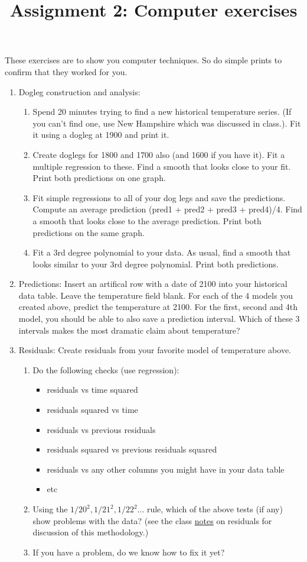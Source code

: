 \documentclass[11pt]{article}
\begin{document}
\title{Assignment 2: Computer exercises}

These exercises are to show you computer techniques.  So do simple
 prints to confirm that they worked for you.

\begin{enumerate}
\item Dogleg construction and analysis:
\begin{enumerate}
\item Spend 20 minutes trying to find a new historical temperature
series.  (If you can't find one, use New Hampshire which was discussed
in class.).   Fit it using a dogleg at 1900 and print it.
\item Create doglegs for 1800 and 1700 also (and 1600 if you have
it).  Fit a multiple regression to these.  Find a smooth that looks
close to your fit.  Print both predictions on one graph. 
\item Fit simple regressions to all of your dog legs and save the
predictions.  Compute an average prediction (pred1 + pred2 + pred3 +
pred4)/4.  Find a smooth that looks close to the average prediction.
Print both predictions on the same graph.
\item Fit a 3rd degree polynomial to your data.  As usual, find a
smooth that looks similar to your 3rd degree polynomial.  Print both
predictions. 
\end{enumerate}

\item Predictions: Insert an artifical row with a date of 2100 into
your historical data table.  Leave the temperature field blank.  For
each of the 4 models you created above, predict the temperature at
2100.   For the first, second and 4th model, you should be able to
also save a prediction interval.  Which of these 3 intervals makes the
most dramatic claim about temperature?

\item Residuals: Create residuals from your favorite model of
temperature above.  
\begin{enumerate}
\item Do the following checks (use regression):
\begin{itemize}
\item residuals vs time squared
\item residuals squared vs time
\item residuals vs previous residuals
\item residuals squared vs previous residuals squared
\item residuals vs any other columns you might have in your data table
\item etc
\end{itemize}
\item Using the $1/20^2, 1/21^2, 1/22^2$... rule, which of the
above tests (if any) show problems with the data?  (see the class
\href{class_residuals.tex.html}{notes} on residuals for discussion of
this methodology.) 
\item If you have a problem, do we know how to fix it yet?
\end{enumerate}


\end{enumerate}
\end{document}
